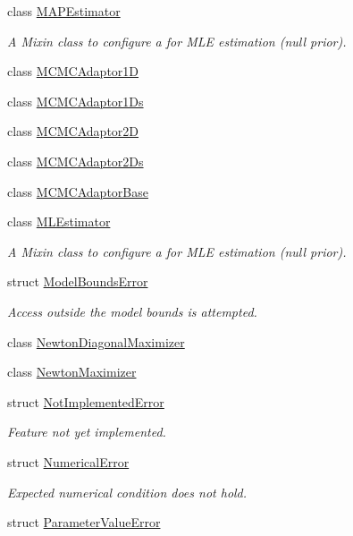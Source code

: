 \begin{DoxyCompactItemize}
class \hyperlink{classmappel_1_1MAPEstimator}{M\+A\+P\+Estimator}
\begin{DoxyCompactList}\small\item\em A Mixin class to configure a for M\+LE estimation (null prior). \end{DoxyCompactList}\item 
class \hyperlink{classmappel_1_1MCMCAdaptor1D}{M\+C\+M\+C\+Adaptor1D}
\item 
class \hyperlink{classmappel_1_1MCMCAdaptor1Ds}{M\+C\+M\+C\+Adaptor1\+Ds}
\item 
class \hyperlink{classmappel_1_1MCMCAdaptor2D}{M\+C\+M\+C\+Adaptor2D}
\item 
class \hyperlink{classmappel_1_1MCMCAdaptor2Ds}{M\+C\+M\+C\+Adaptor2\+Ds}
\item 
class \hyperlink{classmappel_1_1MCMCAdaptorBase}{M\+C\+M\+C\+Adaptor\+Base}
\item 
class \hyperlink{classmappel_1_1MLEstimator}{M\+L\+Estimator}
\begin{DoxyCompactList}\small\item\em A Mixin class to configure a for M\+LE estimation (null prior). \end{DoxyCompactList}\item 
struct \hyperlink{structmappel_1_1ModelBoundsError}{Model\+Bounds\+Error}
\begin{DoxyCompactList}\small\item\em Access outside the model bounds is attempted. \end{DoxyCompactList}\item 
class \hyperlink{classmappel_1_1NewtonDiagonalMaximizer}{Newton\+Diagonal\+Maximizer}
\item 
class \hyperlink{classmappel_1_1NewtonMaximizer}{Newton\+Maximizer}
\item 
struct \hyperlink{structmappel_1_1NotImplementedError}{Not\+Implemented\+Error}
\begin{DoxyCompactList}\small\item\em Feature not yet implemented. \end{DoxyCompactList}\item 
struct \hyperlink{structmappel_1_1NumericalError}{Numerical\+Error}
\begin{DoxyCompactList}\small\item\em Expected numerical condition does not hold. \end{DoxyCompactList}\item 
struct \hyperlink{structmappel_1_1ParameterValueError}{Parameter\+Value\+Error}

\end{DoxyCompactItemize}
